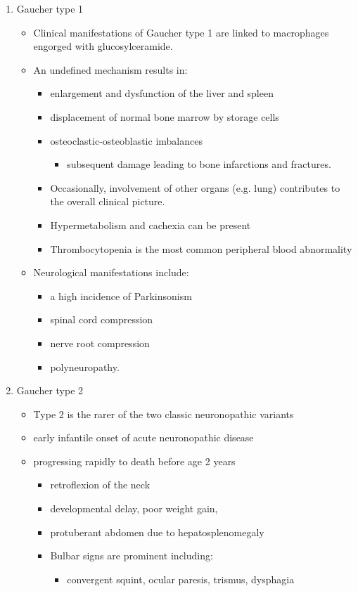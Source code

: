\documentclass{scrartcl}
\begin{document}
\begin{enumerate}
\begin{enumerate}
\item Gaucher type 1
\label{sec:orgad53ca8}
\begin{itemize}
\item Clinical manifestations of Gaucher type 1 are linked to macrophages
engorged with glucosylceramide.

\item An undefined mechanism results in:
\begin{itemize}
\item enlargement and dysfunction of the liver and spleen
\item displacement of normal bone marrow by storage cells
\item osteoclastic-osteoblastic imbalances
\begin{itemize}
\item subsequent damage leading to bone infarctions and fractures.
\end{itemize}
\item Occasionally, involvement of other organs (e.g. lung) contributes
to the overall clinical picture.
\item Hypermetabolism and cachexia can be present
\item Thrombocytopenia is the most common peripheral blood abnormality
\end{itemize}

\item Neurological manifestations include:
\begin{itemize}
\item a high incidence of Parkinsonism
\item spinal cord compression
\item nerve root compression
\item polyneuropathy.
\end{itemize}
\end{itemize}

\item Gaucher type 2
\label{sec:org016cca6}
\begin{itemize}
\item Type 2 is the rarer of the two classic neuronopathic variants
\item early infantile onset of acute neuronopathic disease
\item progressing rapidly to death before age 2 years

\begin{itemize}
\item retroflexion of the neck
\item developmental delay, poor weight gain,
\item protuberant abdomen due to hepatosplenomegaly
\item Bulbar signs are prominent including:
\begin{itemize}
\item convergent squint, ocular paresis, trismus, dysphagia
\end{itemize}
\end{itemize}


\end{itemize}
\end{enumerate}
\end{enumerate}
\end{document}
